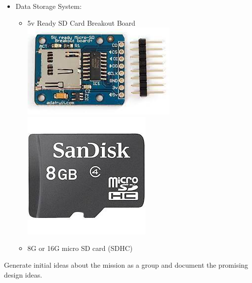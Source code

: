 \documentclass[12pt]{article}
\begin{document}
\begin{description}[labelindent=1cm]
\begin{itemize}
\begin{itemize}
\begin{itemize}
			\end{itemize}
			\item Data Storage System:
				\begin{itemize}
					\item 5v Ready SD Card Breakout Board
					\hspace*{0.5cm}\includegraphics[scale=.3]{sdcard_reader.jpeg}
					\hspace*{0.5cm}\includegraphics[scale=.3]{sd_card.jpeg}
					\item 8G or 16G micro SD card (SDHC) 
					
				\end{itemize}
			
		\end{itemize}
\end{itemize}


\newpage

\item[\textbf{\underline{Part 1 - Initial Brainstorm:}}] \hfill \vspace{0mm}


	Generate initial ideas about the mission as a group and document the promising design ideas.






\end{description}
\end{document}
